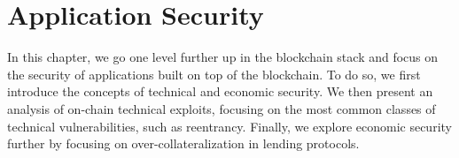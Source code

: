 \chapter{Application Security}
\label{ch:application-security}

In this chapter, we go one level further up in the blockchain stack and focus on the security of applications built on top of the blockchain.
To do so, we first introduce the concepts of technical and economic security.
We then present an analysis of on-chain technical exploits, focusing on the most common classes of technical vulnerabilities, such as reentrancy.
Finally, we explore economic security further by focusing on over-collateralization in lending protocols.






